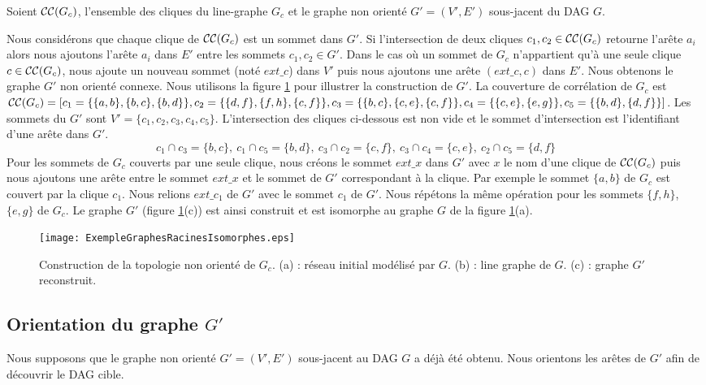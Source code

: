 Soient ${\cal CC}(G_c)$, l'ensemble des cliques du line-graphe $G_c$ et 
le graphe non orient\'e $G'=(V',E')$ sous-jacent du DAG $G$.

Nous consid\'erons que chaque clique de ${\cal CC}(G_c)$ est un sommet dans $G'$.
Si l'intersection de deux cliques $c_1, c_2 \in {\cal CC}(G_c)$ retourne l'ar\^ete $a_i$  alors nous ajoutons  l'ar\^ete $a_i $ dans $E'$ entre les sommets  $c_1, c_2 \in G'$.
Dans  le cas o\`u un sommet de  $G_c$ n'appartient qu'\`a une seule clique $c \in {\cal CC}(G_c)$, nous ajoute  un nouveau sommet (not\'e $ext\_c$) dans $V'$ puis nous ajoutons une ar\^ete $(ext\_c, c)$ dans $E'$.
Nous obtenons le graphe $G'$ non orient\'e connexe.
Nous utilisons la figure \ref{ExempleGraphesRacinesIsomorphes} pour illustrer la construction de $G'$.
La couverture de corr\'elation de $G_c$ est ${\cal CC}(G_c) = [
 c_1 = \{\{a,b\},\{b,c\},\{b,d\}\}, 
 c_2=\{  \{d,f\},\{f,h\},\{c,f\} \}, 
 c_3 = \{  \{b,c\},\{c,e\},\{c,f\} \}, 
 c_4 = \{  \{c,e\},\{e,g\} \}, 
 c_5 = \{  \{b,d\},\{d,f\} \}]$.
Les sommets du $G'$ sont $V' = \{c_1, c_2, c_3, c_4, c_5\}$.
L'intersection des cliques ci-dessous est non vide et le sommet d'intersection est l'identifiant d'une ar\^ete dans $G'$.
$$
c_1 \cap c_3 = \{b,c\}, ~ 
c_1 \cap c_5 = \{b,d\}, ~ 
c_3 \cap c_2 = \{c,f\}, ~ 
c_3 \cap c_4 =   \{c,e\}, ~ 
c_2 \cap c_5 = \{d,f\}
$$
Pour les sommets de $G_c$ couverts par une seule clique, nous cr\'eons le sommet $ext\_x$ dans $G'$ avec $x$ le nom d'une clique de ${\cal CC}(G_c)$ 
puis nous ajoutons une ar\^ete entre le sommet $ext\_x$ et le sommet de $G'$ correspondant \`a la clique.
Par exemple le sommet $\{a,b\}$ de $G_c$ est couvert par la clique $c_1$. 
Nous relions $ext\_c_1$ de $G'$ avec le sommet $c_1$ de $G'$. 
Nous r\'ep\'etons la m\^eme op\'eration pour les sommets  $\{f,h\}$, $\{e,g\}$ de $G_c$.
Le graphe $G'$ (figure \ref{ExempleGraphesRacinesIsomorphes}(c)) est ainsi construit et est isomorphe au graphe $G$ de la figure \ref{ExempleGraphesRacinesIsomorphes}(a).
\begin{figure}[htb!] 
\centering
\texttt{[image: ExempleGraphesRacinesIsomorphes.eps]}
\caption{ Construction de la topologie non orient\'e de $G_c$.
		(a) : r\'eseau initial mod\'elis\'e par $G$.
		(b) : line graphe de $G$.
		(c) : graphe $G'$ reconstruit.
		 }
\label{ExempleGraphesRacinesIsomorphes}
\end{figure}

\subsection{Orientation du graphe $G'$}
Nous supposons que le graphe non orient\'e $G'=(V',E')$ sous-jacent au DAG $G$ a d\'ej\`a \'et\'e  obtenu. Nous orientons les ar\^etes de $G'$ afin de d\'ecouvrir  le DAG cible.
 \newline
 
